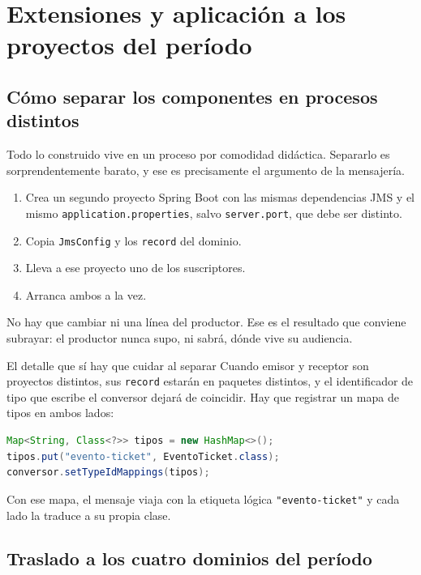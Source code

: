\documentclass[11pt,a4paper]{book}
\newcommand{\clase}[1]{\texttt{#1}}
\newcommand{\ruta}[1]{\texttt{#1}}
\begin{document}
\chapter{Extensiones y aplicación a los proyectos del período}
\label{cap:extensiones}

\section{Cómo separar los componentes en procesos distintos}

Todo lo construido vive en un proceso por comodidad didáctica.
Separarlo es sorprendentemente barato, y ese es precisamente el argumento de la mensajería.

\begin{enumerate}[leftmargin=1.8em,itemsep=3pt,topsep=3pt]
	\item Crea un segundo proyecto Spring Boot con las mismas dependencias JMS y el mismo \ruta{application.properties}, salvo \texttt{server.port}, que debe ser distinto.
	\item Copia \clase{JmsConfig} y los \clase{record} del dominio.
	\item Lleva a ese proyecto uno de los suscriptores.
	\item Arranca ambos a la vez.
\end{enumerate}

No hay que cambiar ni una línea del productor.
Ese es el resultado que conviene subrayar: el productor nunca supo, ni sabrá, dónde vive su audiencia.

\begin{cajaAviso}{El detalle que sí hay que cuidar al separar}
	Cuando emisor y receptor son proyectos distintos, sus \clase{record} estarán en paquetes distintos, y el identificador de tipo que escribe el conversor dejará de coincidir.
	Hay que registrar un mapa de tipos en ambos lados:
	\begin{lstlisting}[language=Java,numbers=none]
Map<String, Class<?>> tipos = new HashMap<>();
tipos.put("evento-ticket", EventoTicket.class);
conversor.setTypeIdMappings(tipos);
	\end{lstlisting}
	Con ese mapa, el mensaje viaja con la etiqueta lógica \texttt{"evento-ticket"} y cada lado la traduce a su propia clase.
\end{cajaAviso}

\section{Traslado a los cuatro dominios del período}
\end{document}
